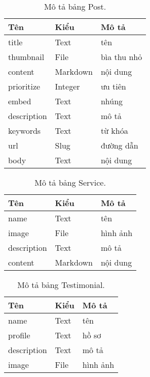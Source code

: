 \begin{table}[h!]
\begin{center}
	\caption{Mô tả bảng Post.}
	\begin{tabular}{ |l|l|l| } 
	\hline
	Tên & Kiểu & Mô tả \\
	\hline
	title & Text & tên \\
thumbnail & File & bìa thu nhỏ \\
content & Markdown & nội dung \\
prioritize & Integer & ưu tiên \\
embed & Text & nhúng \\
description & Text & mô tả \\
keywords & Text & từ khóa \\
url & Slug & đường dẫn \\
body & Text & nội dung \\ 
	\hline
\end{tabular}
	\label{table:Post}
\end{center}
\end{table}


\begin{table}[h!]
\begin{center}
	\caption{Mô tả bảng Service.}
	\begin{tabular}{ |l|l|l| } 
	\hline
	Tên & Kiểu & Mô tả \\
	\hline
	name & Text & tên \\
image & File & hình ảnh \\
description & Text & mô tả \\
content & Markdown & nội dung \\ 
	\hline
\end{tabular}
	\label{table:Service}
\end{center}
\end{table}


\begin{table}[h!]
\begin{center}
	\caption{Mô tả bảng Testimonial.}
	\begin{tabular}{ |l|l|l| } 
	\hline
	Tên & Kiểu & Mô tả \\
	\hline
	name & Text & tên \\
profile & Text & hồ sơ \\
description & Text & mô tả \\
image & File & hình ảnh \\ 
	\hline
\end{tabular}
	\label{table:Testimonial}
\end{center}
\end{table}
